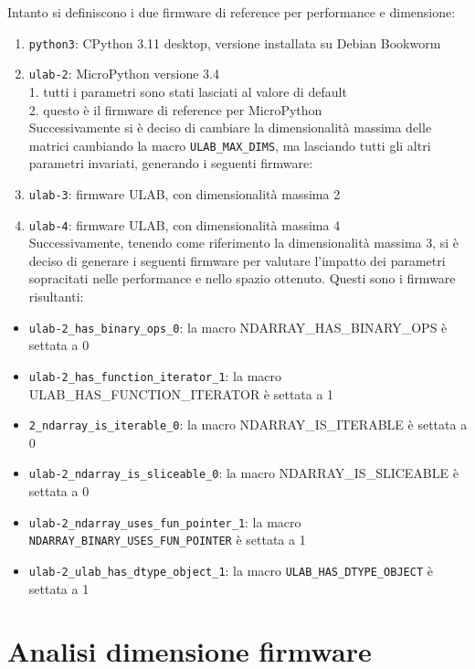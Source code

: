 \documentclass[12pt,a4paper]{report}
\begin{document}
Intanto si definiscono i due firmware di reference per performance e
dimensione:

\begin{enumerate}
\item
  \texttt{python3}: CPython 3.11 desktop, versione installata su Debian
  Bookworm
\item
  \texttt{ulab-2}: MicroPython versione 3.4\\
  1. tutti i parametri sono stati lasciati al valore di default\\
  2. questo è il firmware di reference per MicroPython\\
  Successivamente si è deciso di cambiare la dimensionalità massima
  delle matrici cambiando la macro \texttt{ULAB\_MAX\_DIMS}, ma
  lasciando tutti gli altri parametri invariati, generando i seguenti
  firmware:
\item
  \texttt{ulab-3}: firmware ULAB, con dimensionalità massima 2
\item
  \texttt{ulab-4}: firmware ULAB, con dimensionalità massima 4\\
  Successivamente, tenendo come riferimento la dimensionalità massima 3,
  si è deciso di generare i seguenti firmware per valutare
  l'impatto dei parametri sopracitati nelle performance
  e nello spazio ottenuto. Questi sono i firmware risultanti:
\end{enumerate}

\begin{itemize}
\item
  \texttt{ulab-2\_has\_binary\_ops\_0}: la macro
  NDARRAY\_HAS\_BINARY\_OPS è settata a 0
\item
  \texttt{ulab-2\_has\_function\_iterator\_1}: la macro
  ULAB\_HAS\_FUNCTION\_ITERATOR è settata a 1
\item
  \texttt{2\_ndarray\_is\_iterable\_0}: la macro NDARRAY\_IS\_ITERABLE è
  settata a 0
\item
  \texttt{ulab-2\_ndarray\_is\_sliceable\_0}: la macro
  NDARRAY\_IS\_SLICEABLE è settata a 0
\item
  \texttt{ulab-2\_ndarray\_uses\_fun\_pointer\_1}: la macro
  \texttt{NDARRAY\_BINARY\_USES\_FUN\_POINTER} è settata a 1
\item
  \texttt{ulab-2\_ulab\_has\_dtype\_object\_1}: la macro
  \texttt{ULAB\_HAS\_DTYPE\_OBJECT} è settata a 1
\end{itemize}

\section{Analisi dimensione firmware}
\end{document}
